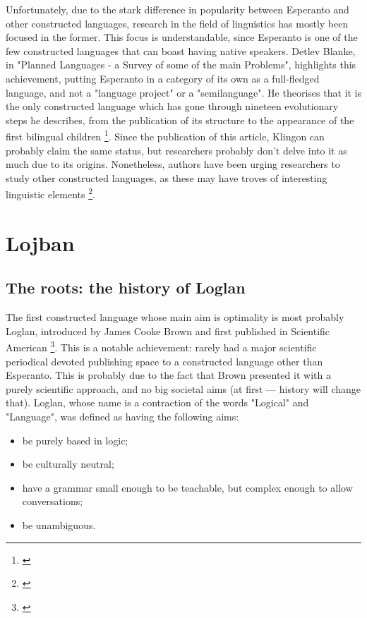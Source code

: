 Unfortunately, due to the stark difference in popularity between Esperanto and other constructed languages, research in the field of linguistics has mostly been focused in the former.
This focus is understandable, since Esperanto is one of the few constructed languages that can boast having native speakers. Detlev Blanke, in "Planned Languages - a Survey of some of the main Problems",
highlights this achievement, putting Esperanto in a category of its own as a full-fledged language, and not a "language project" or a "semilanguage". He theorises that it is the only constructed language
which has gone through nineteen evolutionary steps he describes, from the publication of its structure to the appearance of the first bilingual children \footnote{\cite{blanke1989planned}}. Since the publication
of this article, Klingon can probably claim the same status, but researchers probably don't delve into it as much due to its origins. Nonetheless, authors have been urging researchers to study other
constructed languages, as these may have troves of interesting linguistic elements \footnote{\cite{oostendorp2001constructed}}.

\section{Lojban}

\subsection{The roots: the history of Loglan}

The first constructed language whose main aim is optimality is most probably Loglan, introduced by James Cooke Brown and first published
in Scientific American \footnote{\cite{brown1960loglan}}. This is a notable achievement: rarely had a major scientific periodical devoted publishing
space to a constructed language other than Esperanto. This is probably due to the fact that Brown presented it with a purely scientific approach, and no big societal aims
(at first --- history will change that). Loglan, whose name is a contraction of the words "Logical" and "Language", was defined as having the following aims:

\begin{itemize}
    \setlength\itemsep{-0.5em}
    \item be purely based in logic;
    \item be culturally neutral;
    \item have a grammar small enough to be teachable, but complex enough to allow conversations;
    \item be unambiguous.
 \end{itemize}

